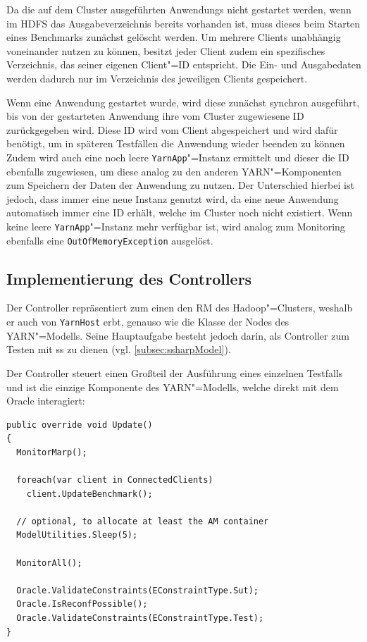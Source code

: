 Da die auf dem Cluster ausgeführten \glspl{Anwendung} \uU nicht gestartet werden, wenn im \gls{HDFS} das Ausgabeverzeichnis bereits vorhanden ist, muss dieses beim Starten eines Benchmarks zunächst gelöscht werden.
Um mehrere Clients unabhängig voneinander nutzen zu können, besitzt jeder Client zudem ein spezifisches Verzeichnis, das seiner eigenen Client"=ID entspricht.
Die Ein- und Ausgabedaten werden dadurch nur im Verzeichnis des jeweiligen Clients gespeichert.

Wenn eine \gls{Anwendung} gestartet wurde, wird diese zunächst synchron ausgeführt, bis von der gestarteten \gls{Anwendung} ihre vom Cluster zugewiesene ID zurückgegeben wird.
Diese ID wird vom Client abgespeichert und wird dafür benötigt, um in späteren Testfällen die \gls{Anwendung} wieder beenden zu können
Zudem wird auch eine noch leere \texttt{YarnApp}"=Instanz ermittelt und dieser die ID ebenfalls zugewiesen, um diese analog zu den anderen \gls{YARN}"=Komponenten zum Speichern der Daten der \gls{Anwendung} zu nutzen.
Der Unterschied hierbei ist jedoch, dass immer eine neue Instanz genutzt wird, da eine neue \gls{Anwendung} automatisch immer eine ID erhält, welche im Cluster noch nicht existiert.
Wenn keine leere \texttt{YarnApp}"=Instanz mehr verfügbar ist, wird analog zum Monitoring ebenfalls eine \texttt{OutOfMemoryException} ausgelöst.

\subsection{Implementierung des Controllers}
\label{subsec:yarnController}

Der Controller repräsentiert zum einen den \gls{RM} des Hadoop"=Clusters, weshalb er auch von \texttt{YarnHost} erbt, genauso wie die Klasse der Nodes des \gls{YARN}"=Modells.
Seine Hauptaufgabe besteht jedoch darin, als Controller zum Testen mit \gls{ss} zu dienen (vgl. \cref{subsec:ssharpModel}).

Der Controller steuert einen Großteil der Ausführung eines einzelnen Testfalls und ist die einzige Komponente des \gls{YARN}"=Modells, welche direkt mit dem Oracle interagiert:

\begin{lstlisting}[label=lst:controllerUpdate,style=cs,
caption={[Update()"=Methode des Controllers]
    \texttt{Update()}"=Methode des Controllers (gekürzt).
    Eine ausführliche Beschreibung des Ablaufs der Ausführung eines Testfalls findet sich in \cref{subsec:simulationStep}.}]
public override void Update()
{
  MonitorMarp();
  
  foreach(var client in ConnectedClients)
    client.UpdateBenchmark();
  
  // optional, to allocate at least the AM container
  ModelUtilities.Sleep(5);
  
  MonitorAll();
  
  Oracle.ValidateConstraints(EConstraintType.Sut);
  Oracle.IsReconfPossible();
  Oracle.ValidateConstraints(EConstraintType.Test);
}
\end{lstlisting}

